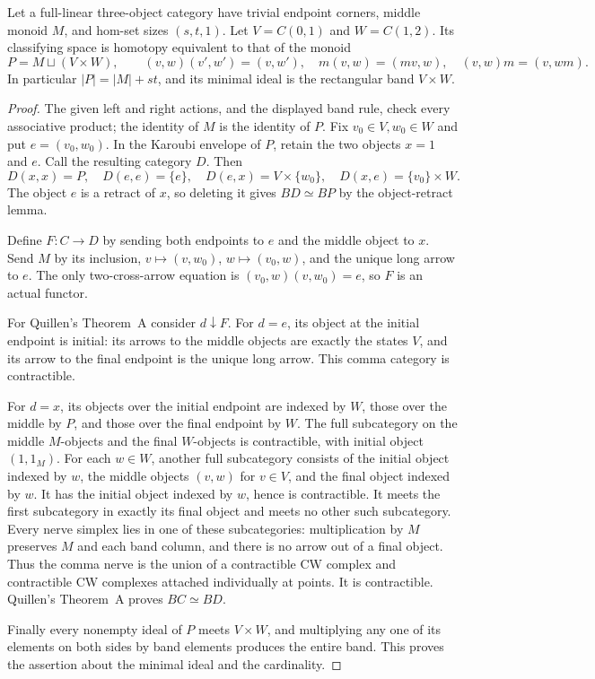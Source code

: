 \begin{lemma}
\label{CP2:A-singleton-triangle-monoid}
Let a full-linear three-object category have trivial endpoint
corners, middle monoid $M$, and hom-set sizes $(s,t,1)$.
Let $V=C(0,1)$ and $W=C(1,2)$. Its classifying space is
homotopy equivalent to that of the monoid
\[
 P=M\sqcup(V\times W),\qquad
 (v,w)(v',w')=(v,w'),\quad
 m(v,w)=(mv,w),\quad(v,w)m=(v,wm).
\]
In particular $|P|=|M|+st$, and its minimal ideal is the
rectangular band $V\times W$.
\end{lemma}
\begin{proof}
The given left and right actions, and the displayed band
rule, check every associative product; the identity of
$M$ is the identity of $P$. Fix $v_0\in V,w_0\in W$ and
put $e=(v_0,w_0)$. In the Karoubi envelope of $P$, retain
the two objects $x=1$ and $e$. Call the resulting category
$D$. Then
\[
 D(x,x)=P,\quad D(e,e)=\{e\},\quad
 D(e,x)=V\times\{w_0\},\quad
 D(x,e)=\{v_0\}\times W.
\]
The object $e$ is a retract of $x$, so deleting it gives
$BD\simeq BP$ by the object-retract lemma.

Define $F:C\to D$ by sending both endpoints to $e$ and
the middle object to $x$. Send $M$ by its inclusion,
$v\mapsto(v,w_0)$, $w\mapsto(v_0,w)$, and the unique
long arrow to $e$. The only two-cross-arrow equation is
$(v_0,w)(v,w_0)=e$, so $F$ is an actual functor.

For Quillen's Theorem~A consider $d\downarrow F$.
For $d=e$, its object at the initial endpoint is initial:
its arrows to the middle objects are exactly the states
$V$, and its arrow to the final endpoint is the unique
long arrow. This comma category is contractible.

For $d=x$, its objects over the initial endpoint are
indexed by $W$, those over the middle by $P$, and those
over the final endpoint by $W$. The full subcategory
on the middle $M$-objects and the final $W$-objects is
contractible, with initial object $(1,1_M)$. For each
$w\in W$, another full subcategory consists of the initial
object indexed by $w$, the middle objects $(v,w)$ for
$v\in V$, and the final object indexed by $w$. It has
the initial object indexed by $w$, hence is contractible.
It meets the first subcategory in exactly its final
object and meets no other such subcategory. Every nerve
simplex lies in one of these subcategories: multiplication
by $M$ preserves $M$ and each band column, and there is
no arrow out of a final object. Thus the comma nerve is
the union of a contractible CW complex and contractible
CW complexes attached individually at points. It is
contractible. Quillen's Theorem~A proves $BC\simeq BD$.

Finally every nonempty ideal of $P$ meets $V\times W$,
and multiplying any one of its elements on both sides
by band elements produces the entire band. This proves
the assertion about the minimal ideal and the cardinality.
\end{proof}

